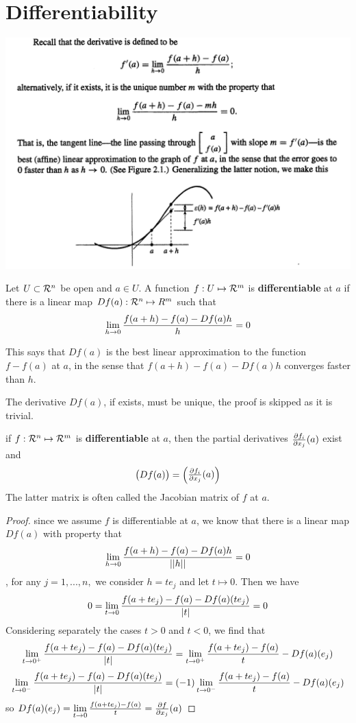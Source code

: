 \section{Differentiability}
\begin{center}
    \includegraphics[totalheight=6cm]{Differential.png}
\end{center}
\begin{definition}
     Let $U \subset \mathcal{R}^{n}$ be open and $a \in U$. A function $f: U \mapsto \mathcal{R}^{m}$ is \textbf{differentiable} at $a$ if there is a linear map $Df(a): \mathcal{R}^{n} \mapsto R^{m}$ such that  $$\lim\limits_{h \to 0}\frac{f(a+h)-f(a)-Df(a)h}{h} = 0$$ 
\end{definition}
This says that $Df(a)$ is the best linear approximation to the function $f - f(a)$ at $a$, in the sense that $f(a+h) - f(a) - Df(a)h$ converges faster than $h$.
\begin{remark}
    The derivative $Df(a)$, if exists, must be unique, the proof is skipped as it is trivial.
\end{remark}
\begin{prop}
    if $f: \mathcal{R}^{n} \mapsto \mathcal{R}^{m}$ is \textbf{differentiable} at $a$, then the partial derivatives $\pdv{f_{i}}{x_{j}}(a)$ exist and $$\begin{pmatrix}Df(a)\end{pmatrix} = \begin{pmatrix}\pdv{f_{i}}{x_{j}}(a)\end{pmatrix}$$
    The latter matrix is often called the Jacobian matrix of $f$ at $a$.
    
\end{prop}
\begin{proof}
    since we assume $f$ is differentiable at $a$, we know that there is a linear map $Df(a)$ with property that $$\lim\limits_{h \to 0}\frac{f(a+h)-f(a)-Df(a)h}{||h||} = 0$$,
    for any $j = 1,...,n,$ we consider $h=te_{j}$ and let $t \mapsto 0$. Then we have $$0 = \lim\limits_{t \to 0}\frac{f(a+te_{j}) - f(a) - Df(a)(te_{j})}{|t|} = 0$$
    Considering separately the cases $t>0$ and $t<0$, we find that $$\lim\limits_{t \to 0^{+}}\frac{f(a+te_{j}) - f(a) - Df(a)(te_{j})}{|t|} = \lim\limits_{t \to 0^{+}}\frac{f(a+te_{j}) - f(a)}{t} - Df(a)(e_{j})$$ 
$$\lim\limits_{t \to 0^{-}}\frac{f(a+te_{j}) - f(a) - Df(a)(te_{j})}{|t|} = (-1)\lim\limits_{t \to 0^{-}}\frac{f(a+te_{j}) - f(a)}{t} - Df(a)(e_{j})$$ 
so $Df(a)(e_{j}) = \lim\limits_{t \to 0}\frac{f(a+te_{j}) - f(a)}{t} = \pdv{f}{x_{j}}(a)$
\end{proof}
